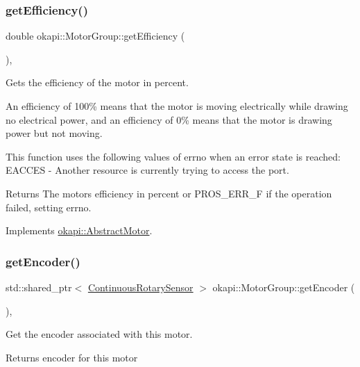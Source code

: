\subsubsection{\texorpdfstring{getEfficiency()}{getEfficiency()}}
{\footnotesize\ttfamily double okapi\+::\+Motor\+Group\+::get\+Efficiency (\begin{DoxyParamCaption}{ }\end{DoxyParamCaption})\hspace{0.3cm}{\ttfamily [override]}, {\ttfamily [virtual]}}

Gets the efficiency of the motor in percent.

An efficiency of 100\% means that the motor is moving electrically while drawing no electrical power, and an efficiency of 0\% means that the motor is drawing power but not moving.

This function uses the following values of errno when an error state is reached\+: E\+A\+C\+C\+ES -\/ Another resource is currently trying to access the port.

\begin{DoxyReturn}{Returns}
The motor\textquotesingle{}s efficiency in percent or P\+R\+O\+S\+\_\+\+E\+R\+R\+\_\+F if the operation failed, setting errno. 
\end{DoxyReturn}


Implements \mbox{\hyperlink{classokapi_1_1AbstractMotor_a27a6e3ec007619a9b91f9d6ebc61e613}{okapi\+::\+Abstract\+Motor}}.

\mbox{\label{classokapi_1_1MotorGroup_a911d4c2a66deafb2e54f66411eceaa59}} 
\subsubsection{\texorpdfstring{getEncoder()}{getEncoder()}}
{\footnotesize\ttfamily std\+::shared\+\_\+ptr$<$ \mbox{\hyperlink{classokapi_1_1ContinuousRotarySensor}{Continuous\+Rotary\+Sensor}} $>$ okapi\+::\+Motor\+Group\+::get\+Encoder (\begin{DoxyParamCaption}{ }\end{DoxyParamCaption})\hspace{0.3cm}{\ttfamily [override]}, {\ttfamily [virtual]}}

Get the encoder associated with this motor.

\begin{DoxyReturn}{Returns}
encoder for this motor 
\end{DoxyReturn}


